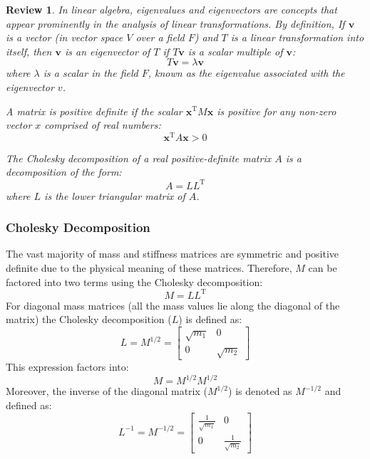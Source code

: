\documentclass[12pt,letter]{article}
\numberwithin{ex}{section} %
\newtheorem{re}{Review}
\numberwithin{re}{section} %
\newenvironment{review}{\begin{mdframed}[middlelinewidth=2mm,roundcorner=20pt]\begin{re}\normalfont}{\end{re}\end{mdframed}}
\begin{document}
\begin{review}

	In linear algebra, eigenvalues and eigenvectors are concepts that appear prominently in the analysis of linear transformations. By definition, If  $\textbf{v}$ is a vector (in vector space $V$ over a field $F$) and $T$ is a linear transformation into itself, then $\textbf{v}$ is an eigenvector of $T$ if $T\textbf{v}$ is a scalar multiple of $\textbf{v}$:
	\begin{equation}
	T\textbf{v} = \lambda\textbf{v}
	\end{equation}
	where $\lambda$ is a scalar in the field $F$, known as the eigenvalue associated with the eigenvector $v$.

	A matrix is positive definite if the scalar $\textbf{x}^{\text{T}}M\textbf{x}$ is positive for any non-zero vector $x$ comprised of real numbers:
	\begin{equation}
	\textbf{x}^{\text{T}}A\textbf{x} > 0
	\end{equation}
	
	The Cholesky decomposition of a real positive-definite matrix $A$ is a decomposition of the form:
	\begin{equation}
	A=LL^{\text{T}}
	\end{equation}
	where $L$ is the lower triangular matrix of $A$.

\end{review}

\subsubsection{Cholesky Decomposition}
The vast majority of mass and stiffness matrices are symmetric and positive definite due to the physical meaning of these matrices. Therefore, $M$ can be factored into two terms using the Cholesky decomposition:
\begin{equation}
	M=LL^{\text{T}}
\end{equation}
For diagonal mass matrices (all the mass values lie along the diagonal of the matrix) the Cholesky decomposition ($L$) is defined as:
\begin{equation}
	L = M^{1/2} = \begin{bmatrix} \sqrt{m_1} & 0 \\  0  & \sqrt{m_2} \end{bmatrix} 
\end{equation}
This expression factors into:
\begin{equation}
	M = M^{1/2}M^{1/2}
\end{equation}
Moreover, the inverse of the diagonal matrix ($M^{1/2}$) is denoted as $M^{-1/2}$ and defined as:
\begin{equation}
	L^{-1} = M^{-1/2} = \begin{bmatrix} \frac{1}{\sqrt{m_1}} & 0 \\  0  & \frac{1}{\sqrt{m_2}} \end{bmatrix} 
\end{equation}
\end{document}
